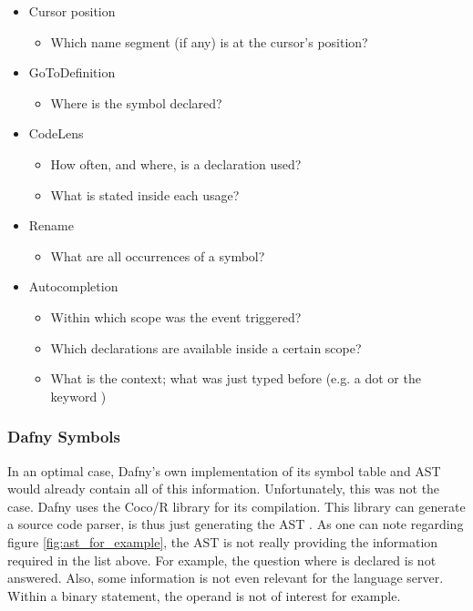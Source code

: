 

\begin{itemize}
    \item Cursor position
    \begin{itemize}
        \item Which name segment (if any) is at the cursor's position?
    \end{itemize}

    \item GoToDefinition
        \begin{itemize}
            \item Where is the symbol declared?
        \end{itemize}

    \item CodeLens
        \begin{itemize}
            \item How often, and where, is a declaration used?
            \item What is stated inside each usage?
        \end{itemize}

    \item Rename
        \begin{itemize}
            \item What are all occurrences of a symbol?
        \end{itemize}

    \item Autocompletion
        \begin{itemize}
            \item Within which scope was the event triggered?
            \item Which declarations are available inside a certain scope?
            \item What is the context; what was just typed before (e.g. a dot or the keyword )
        \end{itemize}
\end{itemize}

\subsubsection{Dafny Symbols}
In an optimal case, Dafny's own implementation of its symbol table and AST would already contain all of this information.
Unfortunately, this was not the case.
Dafny uses the Coco/R library for its compilation.
This library can generate a source code parser, is thus just generating the AST \cite{coco}.
As one can note regarding figure \ref{fig:ast_for_example}, the AST is not really providing the information required in the list above.
For example, the question where  is declared is not answered.
Also, some information is not even relevant for the language server.
Within a binary statement, the operand is not of interest for example.\\

